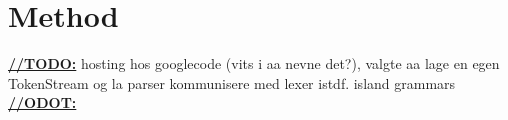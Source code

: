 \chapter{Method}



\underline{\textbf{\LARGE //TODO:}}
hosting hos googlecode (vits i aa nevne det?), valgte aa lage en egen TokenStream og
la parser kommunisere med lexer istdf. island grammars
\\ \underline{\textbf{\LARGE //ODOT:}}